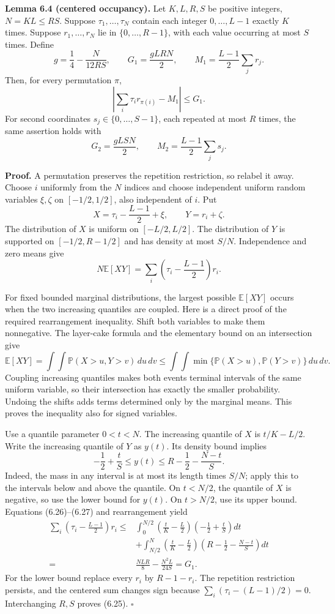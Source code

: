 \documentclass[
  11pt,
  a4paper,
]{article}
\begin{document}
\textbf{Lemma 6.4 (centered occupancy).} Let \(K,L,R,S\) be positive
integers, \(N=KL\le RS\). Suppose \(\tau_1,\ldots,\tau_N\) contain each
integer \(0,\ldots,L-1\) exactly \(K\) times. Suppose \(r_1,\ldots,r_N\)
lie in \(\{0,\ldots,R-1\}\), with each value occurring at most \(S\)
times. Define \[
g=\frac14-\frac{N}{12RS},\qquad
G_1=\frac{gLRN}{2},\qquad
M_1=\frac{L-1}{2}\sum_jr_j.
\tag{6.23}
\] Then, for every permutation \(\pi\), \[
\left|\sum_i\tau_i r_{\pi(i)}-M_1\right|\le G_1.
\tag{6.24}
\] For second coordinates \(s_j\in\{0,\ldots,S-1\}\), each repeated at
most \(R\) times, the same assertion holds with \[
G_2=\frac{gLSN}{2},\qquad M_2=\frac{L-1}{2}\sum_js_j.
\tag{6.25}
\]

\textbf{Proof.} A permutation preserves the repetition restriction, so
relabel it away. Choose \(i\) uniformly from the \(N\) indices and
choose independent uniform random variables \(\xi,\zeta\) on
\([-1/2,1/2]\), also independent of \(i\). Put \[
X=\tau_i-\frac{L-1}{2}+\xi,\qquad Y=r_i+\zeta.
\] The distribution of \(X\) is uniform on \([-L/2,L/2]\). The
distribution of \(Y\) is supported on \([-1/2,R-1/2]\) and has density
at most \(S/N\). Independence and zero means give \[
N\mathbb E[XY]=\sum_i\left(\tau_i-\frac{L-1}{2}\right)r_i.
\tag{6.26}
\]

For fixed bounded marginal distributions, the largest possible
\(\mathbb E[XY]\) occurs when the two increasing quantiles are coupled.
Here is a direct proof of the required rearrangement inequality. Shift
both variables to make them nonnegative. The layer-cake formula and the
elementary bound on an intersection give \[
\mathbb E[XY]=\int\!\!\int\mathbb P(X>u,Y>v)\,du\,dv
\le\int\!\!\int\min\{\mathbb P(X>u),\mathbb P(Y>v)\}\,du\,dv.
\] Coupling increasing quantiles makes both events terminal intervals of
the same uniform variable, so their intersection has exactly the smaller
probability. Undoing the shifts adds terms determined only by the
marginal means. This proves the inequality also for signed variables.

Use a quantile parameter \(0<t<N\). The increasing quantile of \(X\) is
\(t/K-L/2\). Write the increasing quantile of \(Y\) as \(y(t)\). Its
density bound implies \[
-\frac12+\frac tS\le y(t)
\le R-\frac12-\frac{N-t}{S}.
\tag{6.27}
\] Indeed, the mass in any interval is at most its length times \(S/N\);
apply this to the intervals below and above the quantile. On \(t<N/2\),
the quantile of \(X\) is negative, so use the lower bound for \(y(t)\).
On \(t>N/2\), use its upper bound. Equations (6.26)--(6.27) and
rearrangement yield \[
\begin{aligned}
\sum_i\left(\tau_i-\frac{L-1}{2}\right)r_i
\le{}&\int_0^{N/2}\left(\frac tK-\frac L2\right)
                  \left(-\frac12+\frac tS\right)dt\\
&+\int_{N/2}^{N}\left(\frac tK-\frac L2\right)
                  \left(R-\frac12-\frac{N-t}{S}\right)dt\\
={}&\frac{NLR}{8}-\frac{N^2L}{24S}=G_1.
\end{aligned}
\tag{6.28}
\] For the lower bound replace every \(r_i\) by \(R-1-r_i\). The
repetition restriction persists, and the centered sum changes sign
because \(\sum_i(\tau_i-(L-1)/2)=0\). Interchanging \(R,S\) proves
(6.25). \(\square\)
\end{document}
